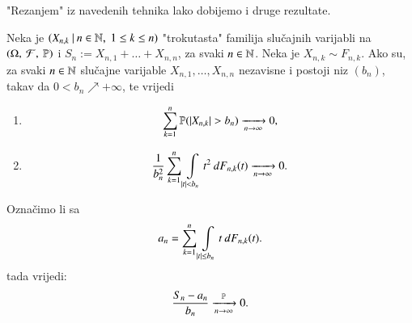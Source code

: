 "Rezanjem" iz navedenih tehnika lako dobijemo i druge rezultate.

\begin{tm}  \label{tm:12.15}
    Neka je $({X_{n, k}} \: | \: {n \in \mathbb{N}, \; 1 \leq k \leq n})$ "trokutasta" familija slu\v cajnih varijabli na $(\Omega, \: \mathcal{F}, \: \mathbb{P})$ i $S_n := X_{n, 1} + \ldots + X_{n, n}$, za svaki $n \in \mathbb{N}$.
    Neka je $X_{n, k} \sim F_{n, k}$.
    Ako su, za svaki $n \in \mathbb{N}$ slu\v cajne varijable $X_{n, 1}, \ldots, X_{n, n}$ nezavisne i postoji niz $(b_n)$, takav da $0 < b_n \nearrow +\infty$, te vrijedi
    \begin{enumerate}[label=(\roman*)]
        \item \label{tm:12.15.1}
        \begin{equation*}
            \sum\limits_{k = 1}^{n} \mathbb{P}({|X_{n, k}| > b_n}) \xrightarrow[n \to \infty]{} 0,
        \end{equation*}
        \item \label{tm:12.15.2}
        \begin{equation*}
            \frac{1}{b_n^2} \sum\limits_{k = 1}^{n} \int\limits_{|t| < b_n} t^2 \: dF_{n, k}(t) \xrightarrow[n \to \infty]{} 0.
        \end{equation*}
    \end{enumerate}
    Ozna\v cimo li sa
    \begin{equation*}
        a_n = \sum\limits_{k = 1}^{n} \int\limits_{|t| \leq b_n} t \: dF_{n, k} (t).
    \end{equation*}
    tada vrijedi:
    \begin{equation*}
        \frac{S_n - a_n}{b_n} \xrightarrow[n \to \infty]{\mathbb{P}} 0.
    \end{equation*}    
\end{tm}

